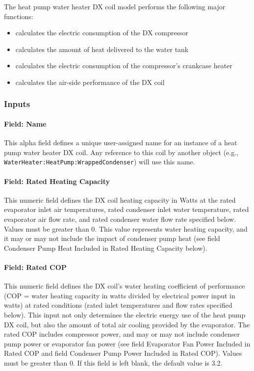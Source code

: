 The heat pump water heater DX coil model performs the following major functions:

\begin{itemize}
\item
  calculates the electric consumption of the DX compressor
\item
  calculates the amount of heat delivered to the water tank
\item
  calculates the electric consumption of the compressor's crankcase heater
\item
  calculates the air-side performance of the DX coil
\end{itemize}

\subsubsection{Inputs}\label{inputs-28}

\paragraph{Field: Name}\label{field-name-27-000}

This alpha field defines a unique user-assigned name for an instance of a heat pump water heater DX coil. Any reference to this coil by another object (e.g., \lstinline!WaterHeater:HeatPump:WrappedCondenser!) will use this name.

\paragraph{Field: Rated Heating Capacity}\label{field-rated-heating-capacity-1}

This numeric field defines the DX coil heating capacity in Watts at the rated evaporator inlet air temperatures, rated condenser inlet water temperature, rated evaporator air flow rate, and rated condenser water flow rate specified below. Values must be greater than 0. This value represents water heating capacity, and it may or may not include the impact of condenser pump heat (see field Condenser Pump Heat Included in Rated Heating Capacity below).

\paragraph{Field: Rated COP}\label{field-rated-cop-1}

This numeric field defines the DX coil's water heating coefficient of performance (COP = water heating capacity in watts divided by electrical power input in watts) at rated conditions (rated inlet temperatures and flow rates specified below). This input not only determines the electric energy use of the heat pump DX coil, but also the amount of total air cooling provided by the evaporator. The rated COP includes compressor power, and may or may not include condenser pump power or evaporator fan power (see field Evaporator Fan Power Included in Rated COP and field Condenser Pump Power Included in Rated COP). Values must be greater than 0. If this field is left blank, the default value is 3.2.


